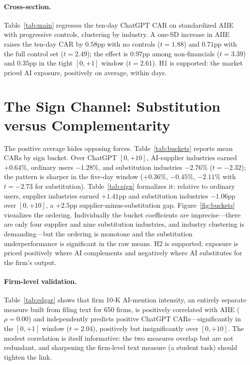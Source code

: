 \documentclass[12pt]{article}
\newcommand{\edgarnfirms}{650}\newcommand{\edgarcorr}{0.00}\newcommand{\edgarshare}{0}}
\begin{document}
\paragraph{Cross-section.} Table~\ref{tab:main} regresses the ten-day ChatGPT CAR on
standardized AIIE with progressive controls, clustering by industry. A one-SD increase
in AIIE raises the ten-day CAR by $0.58$pp with no controls ($t=1.88$) and $0.71$pp with
the full control set ($t=2.49$); the effect is $0.97$pp among non-financials ($t=3.39$)
and $0.35$pp in the tight $[0,+1]$ window ($t=2.61$). H1 is supported: the market priced
AI exposure, positively on average, within days.

\section{The Sign Channel: Substitution versus Complementarity}
The positive average hides opposing forces. Table~\ref{tab:buckets} reports mean CARs by
sign bucket. Over ChatGPT $[0,+10]$, AI-supplier industries earned $+0.64\%$, ordinary
users $-1.28\%$, and substitution industries $-2.76\%$ ($t=-2.32$); the pattern is
sharper in the five-day window ($+0.36\%$, $-0.45\%$, $-2.11\%$ with $t=-2.73$ for
substitution). Table~\ref{tab:sign} formalizes it: relative to ordinary users, supplier
industries earned $+1.41$pp and substitution industries $-1.06$pp over $[0,+10]$, a
$+2.5$pp supplier-minus-substitution gap. Figure~\ref{fig:buckets} visualizes the
ordering. Individually the bucket coefficients are imprecise---there are only four
supplier and nine substitution industries, and industry clustering is demanding---but
the ordering is monotone and the substitution underperformance is significant in the raw
means. H2 is supported: exposure is priced positively where AI complements and
negatively where AI substitutes for the firm's output.

\paragraph{Firm-level validation.} Table~\ref{tab:edgar} shows that firm 10-K AI-mention
intensity, an entirely separate measure built from filing text for \edgarnfirms{} firms,
is positively correlated with AIIE ($\rho=\edgarcorr$) and independently predicts positive
ChatGPT CARs---significantly in the $[0,+1]$ window ($t=2.04$), positively but
insignificantly over $[0,+10]$. The modest correlation is itself informative: the two
measures overlap but are not redundant, and sharpening the firm-level text measure (a
student task) should tighten the link.
\end{document}
